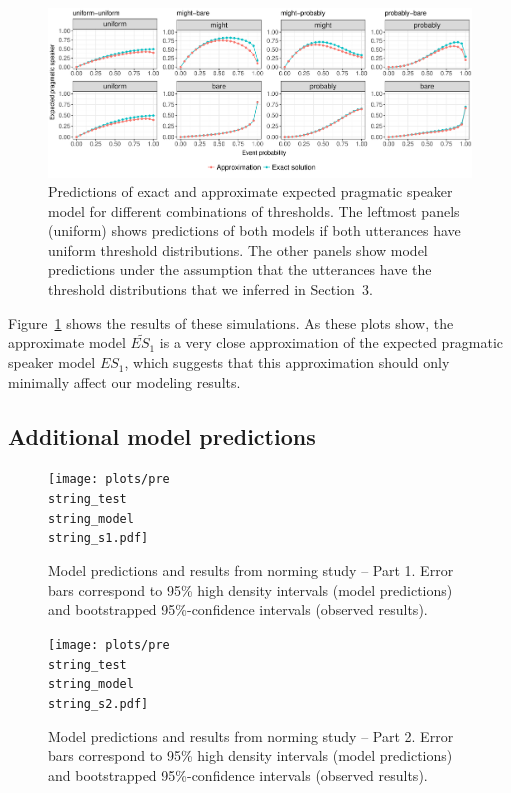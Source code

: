\documentclass[man, floatsintext]{apa6}
\begin{document}
\begin{figure}[bh!]
\includegraphics[width=\textwidth]{plots/approx-simulations.pdf}
\caption{Predictions of exact and approximate expected pragmatic speaker model for different combinations of thresholds. The leftmost panels (uniform) shows predictions of both models if both utterances have uniform threshold distributions. The other panels show model predictions under the assumption that the utterances have the threshold distributions that we inferred in Section~3. \label{fig:approx-simulations}}
\end{figure}

Figure~\ref{fig:approx-simulations} shows the results of these simulations. As these plots show, the approximate model $\widetilde{ES_1}$ is a very close approximation of the expected
pragmatic speaker model $ES_1$, which suggests that this approximation should only minimally affect our modeling results. 

\subsection*{Additional model predictions}


\begin{figure}[h!]
\texttt{[image: plots/pre\\string\_test\\string\_model\\string\_s1.pdf]}
\caption{Model predictions and results from norming study -- Part 1. Error bars correspond to 95\% high density intervals (model predictions) and bootstrapped 95\%-confidence intervals (observed results). \label{fig:norming-results-model-1}}

\end{figure}

\begin{figure}[h!]
\texttt{[image: plots/pre\\string\_test\\string\_model\\string\_s2.pdf]}
\caption{Model predictions and results from norming study -- Part 2. Error bars correspond to 95\% high density intervals (model predictions) and bootstrapped 95\%-confidence intervals (observed results). \label{fig:norming-results-model-2}}

\end{figure}
\end{document}
